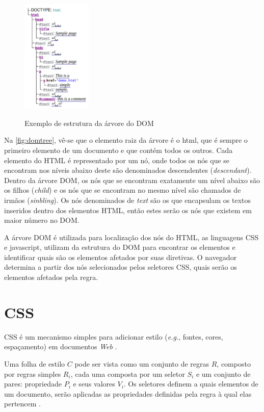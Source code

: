 \begin{figure}[!htb]
	\centering
	\caption{Exemplo de estrutura da árvore do DOM}
	\includegraphics[width=0.3\textwidth]{./04-figuras/DOMsnippet}
	\label{fig:domtree}
\end{figure}

Na \autoref{fig:domtree}, vê-se que o elemento raiz da árvore é o html, que é sempre o primeiro elemento de um documento e que contém todos os outros. Cada elemento do HTML é representado por um nó, onde todos os nós que se encontram nos níveis abaixo deste são denominados descendentes (\textit{descendant}). Dentro da árvore DOM, os nós que se encontram exatamente um nível abaixo são os filhos (\textit{child}) e os nós que se encontram no mesmo nível são chamados de irmãos (\textit{sinbling}). Os nós denominados de \textit{text} são os que encapsulam os textos inseridos dentro dos elementos HTML, então estes serão os nós que existem em maior número no DOM.

A árvore DOM é utilizada para localização dos nós do HTML, as linguagens  CSS e javascript, utilizam da estrutura do DOM para encontrar os elementos e identificar quais são os elementos afetados por suas diretivas. O navegador determina a partir dos nós selecionados pelos seletores CSS, quais serão os elementos afetados pela regra.

\section{CSS}
\label{sec:CSS}
CSS é um mecanismo simples para adicionar estilo (\textit{e.g.}, fontes, cores, espaçamento) em documentos \textit{Web} \cite{W3Ccss2015}.

Uma folha de estilo \(C\) pode ser vista como um conjunto de regras \(R\), composto por regras simples \(R_i\), cada uma composta por um seletor \(S_i\) e um conjunto de pares: propriedade \(P_i\) e seus valores \(V_i\). Os seletores definem a quais elementos de um documento, serão aplicadas as propriedades definidas pela regra à qual elas pertencem \cite{Geneves2012}.

